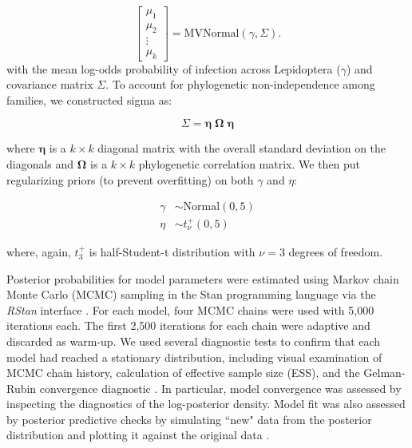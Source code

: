 \documentclass{frontiersSCNS}
\begin{document}
\begin{equation}
	\begin{bmatrix}
		\mu_{1} \\
        \mu_{2} \\
        \vdots \\
        \mu_{k}
	\end{bmatrix}
    = 
    \textrm{MVNormal}(\gamma, \Sigma).
\end{equation}
with the mean log-odds probability of infection across Lepidoptera ($\gamma$) and covariance matrix $\Sigma$. To account for phylogenetic non-independence among families, we constructed sigma as:

\begin{equation}
	\Sigma = \boldsymbol{\eta} \;	\boldsymbol{\Omega} \; \boldsymbol{\eta}
\end{equation}

where $\boldsymbol{\eta}$ is a $k \times k$ diagonal matrix with the overall standard deviation on the diagonals and $\boldsymbol{\Omega}$ is a $k \times k$ phylogenetic correlation matrix. We then put regularizing priors (to prevent overfitting) on both $\gamma$ and $\eta$:

\begin{align}
	\gamma 	&\sim \mathrm{Normal}(0, 5) \nonumber \\
	\eta   	&\sim t_{\nu}^{+}(0,5)
\end{align}

where, again, $t_{3}^{+}$ is half-Student-t distribution with $\nu=3$ degrees of freedom. 

Posterior probabilities for model parameters were estimated using Markov chain Monte Carlo (MCMC) sampling in the Stan programming language \citep{Carpenter:2016aa} via the \emph{RStan} interface \citep{stan:2016aa}. For each model, four MCMC chains were used with 5,000 iterations each. The first 2,500 iterations for each chain were adaptive and discarded as warm-up. We used several diagnostic tests to confirm that each model had reached a stationary distribution,  including visual examination of MCMC chain history, calculation of effective sample size (ESS), and the Gelman-Rubin convergence diagnostic \citep[$\hat{R}$; ][]{Gelman:1992aa,Brooks:1998aa}. In particular, model convergence was assessed by inspecting the diagnostics of the log-posterior density. Model fit was also assessed by posterior predictive checks by simulating ``new" data from the posterior distribution and plotting it against the original data \citep{Gelman:2013aa}.
\end{document}
